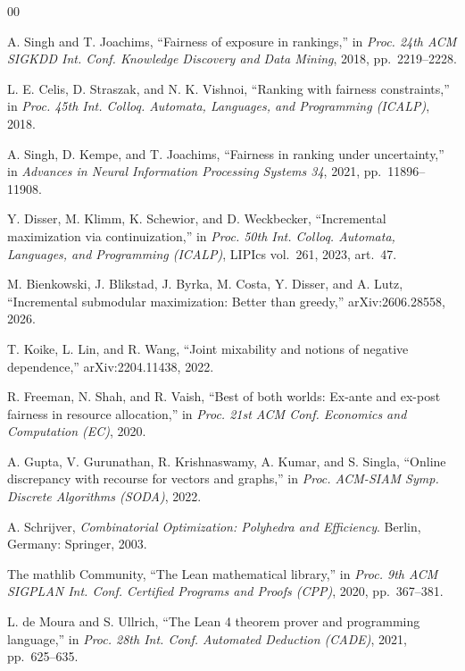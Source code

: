 \begin{thebibliography}{00}

 A. Singh and T. Joachims, ``Fairness of exposure in rankings,'' in
\emph{Proc. 24th ACM SIGKDD Int. Conf. Knowledge Discovery and Data Mining}, 2018,
pp.~2219--2228.

 L. E. Celis, D. Straszak, and N. K. Vishnoi, ``Ranking with fairness
constraints,'' in \emph{Proc. 45th Int. Colloq. Automata, Languages, and Programming
(ICALP)}, 2018.

 A. Singh, D. Kempe, and T. Joachims, ``Fairness in ranking under
uncertainty,'' in \emph{Advances in Neural Information Processing Systems 34}, 2021,
pp.~11896--11908.

 Y. Disser, M. Klimm, K. Schewior, and D. Weckbecker, ``Incremental
maximization via continuization,'' in \emph{Proc. 50th Int. Colloq. Automata, Languages, and
Programming (ICALP)}, LIPIcs vol.~261, 2023, art.~47.

 M. Bienkowski, J. Blikstad, J. Byrka, M. Costa, Y. Disser, and
A. Lutz, ``Incremental submodular maximization: Better than greedy,'' arXiv:2606.28558, 2026.

 T. Koike, L. Lin, and R. Wang, ``Joint mixability and notions of negative
dependence,'' arXiv:2204.11438, 2022.

 R. Freeman, N. Shah, and R. Vaish, ``Best of both worlds: Ex-ante and
ex-post fairness in resource allocation,'' in \emph{Proc. 21st ACM Conf. Economics and
Computation (EC)}, 2020.

 A. Gupta, V. Gurunathan, R. Krishnaswamy, A. Kumar, and S. Singla,
``Online discrepancy with recourse for vectors and graphs,'' in \emph{Proc. ACM-SIAM Symp.
Discrete Algorithms (SODA)}, 2022.

 A. Schrijver, \emph{Combinatorial Optimization: Polyhedra and
Efficiency}. Berlin, Germany: Springer, 2003.

 The mathlib Community, ``The Lean mathematical library,'' in
\emph{Proc. 9th ACM SIGPLAN Int. Conf. Certified Programs and Proofs (CPP)}, 2020,
pp.~367--381.

 L. de Moura and S. Ullrich, ``The Lean 4 theorem prover and
programming language,'' in \emph{Proc. 28th Int. Conf. Automated Deduction (CADE)}, 2021,
pp.~625--635.

\end{thebibliography}


